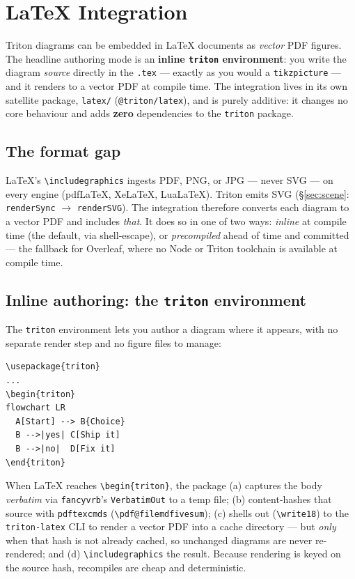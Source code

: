 \section{LaTeX Integration}
\label{sec:latex-integration}

Triton diagrams can be embedded in \LaTeX{} documents as \emph{vector} PDF
figures. The headline authoring mode is an \textbf{inline \texttt{triton}
environment}: you write the diagram \emph{source} directly in the \texttt{.tex}
--- exactly as you would a \texttt{tikzpicture} --- and it renders to a vector PDF
at compile time. The integration lives in its own satellite package,
\texttt{latex/} (\texttt{@triton/latex}), and is purely additive: it changes no
core behaviour and adds \textbf{zero} dependencies to the \texttt{triton} package.

\subsection{The format gap}

\LaTeX{}'s \texttt{\textbackslash includegraphics} ingests PDF, PNG, or JPG ---
never SVG --- on every engine (pdf\LaTeX{}, Xe\LaTeX{}, Lua\LaTeX{}). Triton emits
SVG (\S\ref{sec:scene}: \texttt{renderSync} $\rightarrow$ \texttt{renderSVG}). The
integration therefore converts each diagram to a vector PDF and includes
\emph{that}. It does so in one of two ways: \emph{inline} at compile time (the
default, via shell-escape), or \emph{precompiled} ahead of time and committed ---
the fallback for Overleaf, where no Node or Triton toolchain is available at
compile time.

\subsection{Inline authoring: the \texttt{triton} environment}

The \texttt{triton} environment lets you author a diagram where it appears,
with no separate render step and no figure files to manage:

\begin{lstlisting}[language=triton]
\usepackage{triton}
...
\begin{triton}
flowchart LR
  A[Start] --> B{Choice}
  B -->|yes| C[Ship it]
  B -->|no|  D[Fix it]
\end{triton}
\end{lstlisting}

When \LaTeX{} reaches \texttt{\textbackslash begin\{triton\}}, the package (a) captures the
body \emph{verbatim} via \texttt{fancyvrb}'s \texttt{VerbatimOut} to a temp file;
(b) content-hashes that source with \texttt{pdftexcmds} (\texttt{\textbackslash pdf@filemdfivesum});
(c) shells out (\texttt{\textbackslash write18}) to the \texttt{triton-latex} CLI to render a
vector PDF into a cache directory --- but \emph{only} when that hash is not
already cached, so unchanged diagrams are never re-rendered; and (d)
\texttt{\textbackslash includegraphics} the result. Because rendering is keyed on the source
hash, recompiles are cheap and deterministic.

